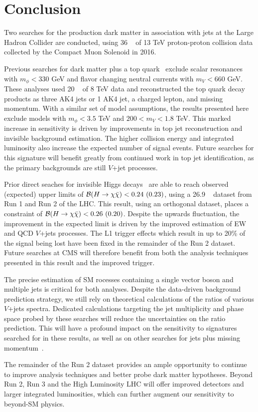 \chapter{Conclusion}

Two searches for the production dark matter in association with jets at the Large Hadron Collider are conducted, using 36 \fbinv~ of 13 TeV proton-proton collision data collected by the Compact Muon Solenoid in 2016.

Previous searches for dark matter plus a top quark~\cite{cms8mt,atlas8mt} exclude scalar resonances with $m_\phi<330$ GeV and flavor changing neutral currents with $m_V<660$ GeV.
These analyses used 20 \fbinv~ of 8 TeV data and reconstructed the top quark decay products as three AK4 jets or 1 AK4 jet, a charged lepton, and missing momentum.
With a similar set of model assumptions, the results presented here exclude models with $m_\phi < 3.5$ TeV and $200<m_V<1.8$ TeV.
This marked increase in sensitivity is driven by improvements in top jet reconstruction and invisible background estimation.
The higher collision energy and integrated luminosity also increase the expected number of signal events. 
Future searches for this signature will benefit greatly from continued work in top jet identification, as the primary backgrounds are still $V$+jet processes.

Prior direct seaches for invisible Higgs decays~\cite{cmshinvrun1} are able to reach observed (expected) upper limits of $\mathcal{B}(H\rightarrow\chi\bar\chi) < 0.24~(0.23)$, using a 26.9 \fbinv~ dataset from Run 1 and Run 2 of the LHC.
This result, using an orthogonal dataset, places a constraint of $\mathcal{B}(H\rightarrow\chi\bar\chi) < 0.26~(0.20)$.
Despite the upwards fluctuation, the improvement in the expected limit is driven by the improved estimation of EW and QCD $V$+jets processes.
The L1 trigger effects which result in up to 20\% of the signal being lost have been fixed in the remainder of the Run 2 dataset.
Future searches at CMS will therefore benefit from both the analysis techniques presented in this result and the improved trigger.

The precise estimation of SM rocesses containing a single vector boson and multiple jets is critical for both analyses.
Despite the data-driven background prediction strategy, we still rely on theoretical calculations of the ratios of various $V$+jets spectra.
Dedicated calculations targeting the jet multiplicity and phase space probed by these searches will reduce the uncertainties on the ratio prediction.
This will have a profound impact on the sensitivity to signatures searched for in these results, as well as on other searches for jets plus missing momentum~\cite{monojet,monohiggs,ttdm}.

The remainder of the Run 2 dataset provides an ample opportunity to continue to improve analysis techniques and better probe dark matter hypotheses.
Beyond Run 2, Run 3 and the High Luminosity LHC will offer improved detectors and larger integrated luminosities, which can further augment our sensitivity to beyond-SM physics.
